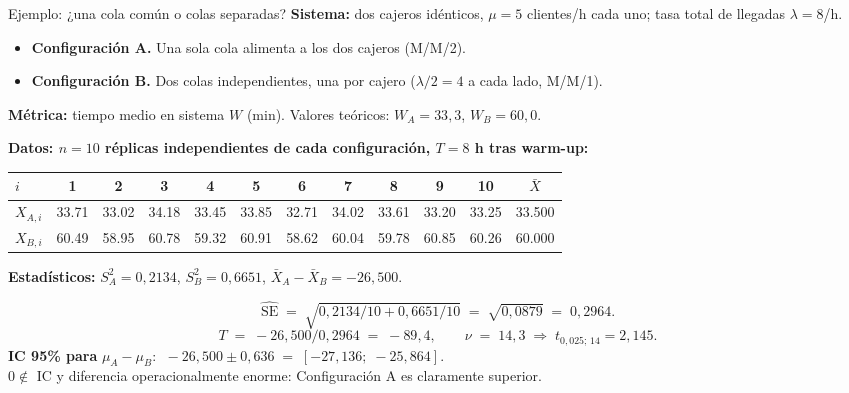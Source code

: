 \documentclass[aspectratio=1610, 10pt]{beamer}
\begin{document}
\begin{frame}{Ejemplo: ¿una cola común o colas separadas?}
\textbf{Sistema:} dos cajeros idénticos, $\mu = 5$ clientes/h cada uno; tasa total de llegadas $\lambda = 8$/h.
\begin{itemize}\small
\item \textbf{Configuración A.} Una sola cola alimenta a los dos cajeros (M/M/2).
\item \textbf{Configuración B.} Dos colas independientes, una por cajero ($\lambda/2 = 4$ a cada lado, M/M/1).
\end{itemize}

\textbf{Métrica:} tiempo medio en sistema $W$ (min). Valores teóricos: $W_A = 33{,}3$, $W_B = 60{,}0$.

\vspace{0.2cm}
\textbf{Datos: $n=10$ réplicas independientes de cada configuración, $T = 8$ h tras warm-up:}

\begin{table}
\centering
\scriptsize
\begin{tabular}{l|cccccccccc|c}
\toprule
$i$        & 1 & 2 & 3 & 4 & 5 & 6 & 7 & 8 & 9 & 10 & $\bar X$ \\
\midrule
$X_{A,i}$  & 33.71 & 33.02 & 34.18 & 33.45 & 33.85 & 32.71 & 34.02 & 33.61 & 33.20 & 33.25 & 33.500 \\
$X_{B,i}$  & 60.49 & 58.95 & 60.78 & 59.32 & 60.91 & 58.62 & 60.04 & 59.78 & 60.85 & 60.26 & 60.000 \\
\bottomrule
\end{tabular}
\end{table}

\vspace{0.1cm}
\textbf{Estadísticos:} $S_A^2 = 0{,}2134$, $S_B^2 = 0{,}6651$, $\bar X_A - \bar X_B = -26{,}500$.

\vspace{0.1cm}
\[
\widehat{\mathrm{SE}} \;=\; \sqrt{0{,}2134/10 + 0{,}6651/10} \;=\; \sqrt{0{,}0879} \;=\; 0{,}2964.
\]
\[
T \;=\; -26{,}500 / 0{,}2964 \;=\; -89{,}4, \qquad \nu \;=\; 14{,}3 \;\Rightarrow\; t_{0{,}025;\,14} = 2{,}145.
\]
\textbf{IC 95\% para} $\mu_A-\mu_B$: $\;-26{,}500 \pm 0{,}636 \;=\; [-27{,}136;\; -25{,}864]$. \\
$0 \notin$ IC y diferencia operacionalmente enorme: \textcolor{deepgreen}{Configuración A es claramente superior}.
\end{frame}

\end{document}
